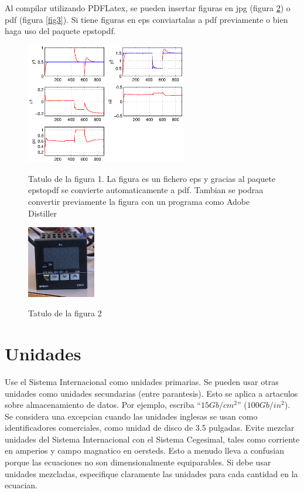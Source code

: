 \documentclass[5p,times,authoryear]{elsarticle}
\begin{document}
Al compilar utilizando PDFLatex, se pueden insertar figuras en jpg (figura \ref{fig2}) o pdf (figura \ref{fig3}). Si tiene figuras en eps conviartalas a pdf previamente o bien haga uso del paquete epstopdf.

\begin{figure}
\centering
  \includegraphics[width=7cm]{figuraeps}\\
  \caption{Tatulo de la figura 1. La figura es un fichero eps y gracias al paquete epstopdf se convierte automaticamente a pdf. Tambian se podraa convertir previamente la figura con un programa como Adobe Distiller}\label{fig1}
\end{figure}

\begin{figure}
\centering
  \includegraphics[width=3cm]{figurajpeg}\\
  \caption{Tatulo de la figura 2}\label{fig2}
\end{figure}


\section{Unidades}

Use el Sistema Internacional como unidades primarias. Se pueden usar
otras unidades como unidades secundarias (entre parantesis). Esto se
aplica a artaculos sobre almacenamiento de datos. Por ejemplo,
escriba ``$15 Gb/cm^2$'' ($100 Gb/in^2$). Se considera una excepcian
cuando las unidades inglesas se usan como identificadores
comerciales, como unidad de disco de 3.5 pulgadas. Evite mezclar
unidades del Sistema Internacional con el Sistema Cegesimal, tales
como corriente en amperios y campo magnatico en  oersteds. Esto a
menudo lleva a confusian porque las ecuaciones no son
dimensionalmente equiparables. Si debe usar unidades mezcladas,
especifique claramente las unidades para cada cantidad  en la
ecuacian. \citep{Abl:45} \citep{Abl:56} \citep{AbTaRu:54}
\end{document}
